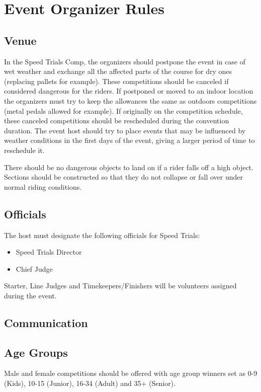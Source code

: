 \chapter{Event Organizer Rules}

\section{Venue}

In the Speed Trials Comp, the organizers should postpone the event in case of wet weather and exchange all the affected parts of the course for dry ones (replacing pallets for example).
These competitions should be canceled if considered dangerous for the riders.
If postponed or moved to an indoor location the organizers must try to keep the allowances the same as outdoors competitions (metal pedals allowed for example).
If originally on the competition schedule, these canceled competitions should be rescheduled during the convention duration.
The event host should try to place events that may be influenced by weather conditions in the first days of the event, giving a larger period of time to reschedule it.

There should be no dangerous objects to land on if a rider falls off a high object.
Sections should be constructed so that they do not collapse or fall over under normal riding conditions.

\section{Officials}

The host must designate the following officials for Speed Trials:
\begin{itemize}
\item Speed Trials Director
\item Chief Judge
\end{itemize}
Starter, Line Judges and Timekeepers/Finishers will be volunteers assigned during the event.
\section{Communication}

\section{Age Groups}

Male and female competitions should be offered with age group winners set as 0-9 (Kids), 10-15 (Junior), 16-34 (Adult) and 35+ (Senior).

